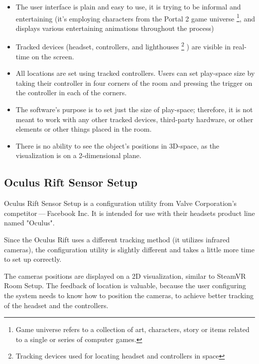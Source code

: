 \begin{itemize}

\item The user interface is plain and easy to use, it is trying to be informal
and entertaining (it’s employing characters from the Portal 2 game universe
\footnote{Game universe refers to a collection of art, characters, story or items related to a single or series of computer games.},
and displays various entertaining animations throughout the process)

\item Tracked devices (headset, controllers, and lighthouses
\footnote{Tracking devices used for locating headset and controllers in space}
) are visible in
real-time on the screen.

\item All locations are set using tracked controllers. Users can set play-space
size by taking their controller in four corners of the room and pressing
the trigger on the controller in each of the corners.

\item The software’s purpose is to set just the size of play-space; therefore, it is not
meant to work with any other tracked devices, third-party hardware, or other elements or
other things placed in the room.

\item There is no ability to see the object’s positions in 3D-space, as the visualization is
on a 2-dimensional plane.

\end{itemize}


\hypertarget{x-oculus-rift-sensor-setup}{\subsection{Oculus Rift Sensor Setup}}
Oculus Rift Sensor Setup is a configuration utility from Valve Corporation’s
competitor — Facebook Inc. It is intended for use with their headsets
product line named "Oculus".


Since the Oculus Rift uses a different tracking method (it utilizes infrared cameras),
the configuration utility is slightly different and takes a little more
time to set up correctly.


The cameras positions are displayed on a 2D visualization, similar
to SteamVR Room Setup. The feedback of location is valuable, because the
user configuring the system needs to know how to position the
cameras, to achieve better tracking of the headset and the controllers.


